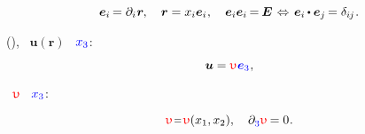 \begin{equation*}
\bm{e}_i \hspace{-0.2ex} = \partial_i \hspace{.1ex} \locationvector
\hspace{-0.1ex} ,
\hspace{1em}
\locationvector = x_i \bm{e}_i
\hspace{.1ex} ,
\hspace{1em}
\bm{e}_i \bm{e}_i \hspace{-0.2ex} = \hspace{-0.15ex} \UnitDyad
\hspace{.2ex} \Leftrightarrow \hspace{.25ex}
\bm{e}_i \hspace{-0.1ex}
\dotp
\bm{e}_j \hspace{-0.2ex}
= \delta_{i\hspace{-0.1ex}j}
\hspace{.15ex} .
\end{equation*}

 (),
~$\bm{u}(\bm{r})$
~$\mathcolor{blue}{x_3}$:

\begin{equation*}
\bm{u} = \antiplanedisplacement \hspace{.1ex} \mathcolor{blue}{\bm{e}_3}
\hspace{.1ex} ,
\end{equation*}

\noindent
{}~$\antiplanedisplacement$
~$\mathcolor{blue}{x_3}$:

\begin{equation*}
\antiplanedisplacement \narroweq \antiplanedisplacement(x_1, x_2),
\hspace{1em}
\partial_{\raisemath{-0.15ex}{\mathcolor{blue}{3}}} \antiplanedisplacement \hspace{-0.15ex} = 0
\hspace{.1ex} .
\end{equation*}


